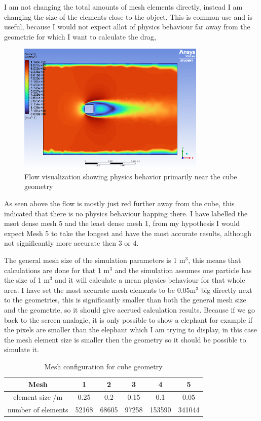 \documentclass[12pt,a4paper]{article}
\begin{document}
I am not changing the total amounts of mesh elements directly, instead I am changing the size of the elements close to the object. This is common use and is useful, because I would not expect allot of physics behaviour far away from the geometrie for which I want to calculate the drag, 

\begin{figure}[H]
    \centering
    \includegraphics[width=0.8\textwidth]{image1.png}
    \caption{Flow visualization showing physics behavior primarily near the cube geometry}
    \label{fig:flow_viz}
\end{figure}

As seen above the flow is mostly just red further away from the cube, this indicated that there is no physics behaviour happing there. I have labelled the msot dense mesh 5 and the least dense mesh 1, from my hypothesis I would expect Mesh 5 to take the longest and have the most accurate results, although not significantly more accurate then 3 or 4. 

The general mesh size of the simulation parameters is 1 m$^3$, this means that calculations are done for that 1 m$^3$ and the simulation assumes one particle has the size of 1 m$^3$ and it will calculate a mean physics behaviour for that whole area. I have set the most accurate mesh elements to be 0.05m$^3$ big directly next to the geometries, this is significantly smaller than both the general mesh size and the geometrie, so it should give accrued calculation results. Because if we go back to the screen analagie, it is only possible to show a elephant for example if the pixels are smaller than the elephant which I am trying to display, in this case the mesh element size is smaller then the geometry so it should be possible to simulate it.

\begin{table}[H]
\centering
\caption{Mesh configuration for cube geometry}
\label{tab:mesh_config}
\begin{tabular}{|c|c|c|c|c|c|}
\hline
\rowcolor{red!50}
\textbf{Mesh} & \textbf{1} & \textbf{2} & \textbf{3} & \textbf{4} & \textbf{5} \\
\hline
element size /m & 0.25 & 0.2 & 0.15 & 0.1 & 0.05 \\
\hline
number of elements & 52168 & 68605 & 97258 & 153590 & 341044 \\
\hline
\end{tabular}
\end{table}
\end{document}
